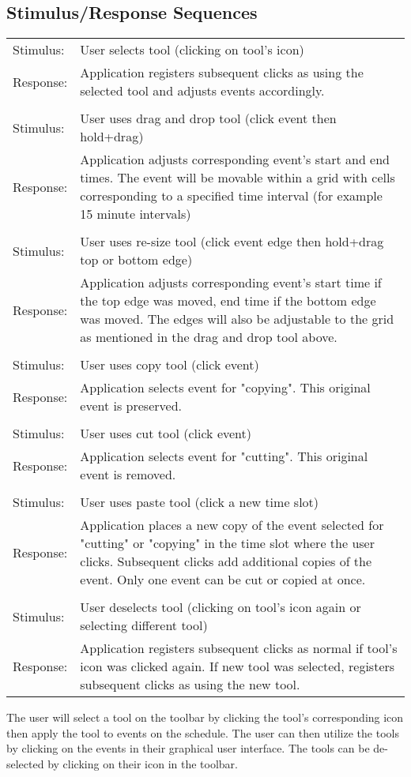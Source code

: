 \documentclass{scrreprt}
\begin{document}
\subsection{Stimulus/Response Sequences}
\begin{center}
    \begin{tabular}{ p{2cm} p{13cm} }
    Stimulus: & User selects tool (clicking on tool's icon)\\
    Response: & Application registers subsequent clicks as using the selected tool and
    adjusts events accordingly.\\
    \\
    Stimulus: & User uses drag and drop tool (click event then hold+drag)\\
    Response: & Application adjusts corresponding event's start and end times. The event
    will be movable within a grid with cells corresponding to a specified time
    interval (for example 15 minute intervals)\\
    \\
    Stimulus: & User uses re-size tool (click event edge then hold+drag top or bottom edge)\\
    Response: & Application adjusts corresponding event's start time if the top
    edge was moved, end time if the bottom edge was moved. The edges will also be adjustable
    to the grid as mentioned in the drag and drop tool above.\\
    \\
    Stimulus: & User uses copy tool (click event)\\
    Response: & Application selects event for "copying". This original event is preserved.\\
    \\
    Stimulus: & User uses cut tool (click event)\\
    Response: & Application selects event for "cutting". This original event is removed.\\
    \\
    Stimulus: & User uses paste tool (click a new time slot)\\
    Response: & Application places a new copy of the event selected for "cutting" or "copying"
    in the time slot where the user clicks. Subsequent clicks add additional copies of the
    event. Only one event can be cut or copied at once.\\
    \\
    Stimulus: & User deselects tool (clicking on tool's icon again or selecting different tool)\\
    Response: & Application registers subsequent clicks as normal if tool's icon
    was clicked again. If new tool was selected, registers subsequent clicks as
    using the new tool.
    \end{tabular}
\end{center}
The user will select a tool on the toolbar by clicking the tool's corresponding icon
then apply the tool to events on the schedule. The user can then utilize the tools
by clicking on the events in their graphical user interface. The tools can be de-selected
by clicking on their icon in the toolbar.
\end{document}
